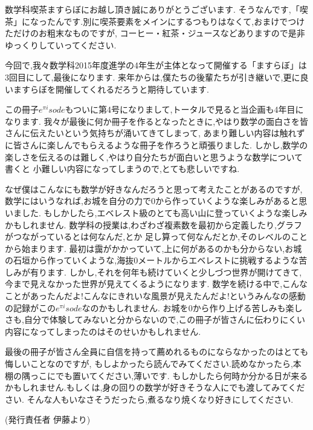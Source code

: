 数学科喫茶ますらぼにお越し頂き誠にありがとうございます.
そうなんです,「喫茶」になったんです.別に喫茶要素をメインにするつもりはなくて,おまけでつけただけのお粗末なものですが,
コーヒー・紅茶・ジュースなどありますので是非ゆっくりしていってください.\par

今回で,我々数学科2015年度進学の4年生が主体となって開催する「ますらぼ」は3回目にして,最後になります.
来年からは,僕たちの後輩たちが引き継いで,更に良いますらぼを開催してくれるだろうと期待しています.\par

この冊子$e^{\pi i}sode$もついに第4号になりまして,トータルで見ると当企画も4年目になります.
我々が最後に何か冊子を作るとなったときに,やはり数学の面白さを皆さんに伝えたいという気持ちが涌いてきてしまって,
あまり難しい内容は触れずに皆さんに楽しんでもらえるような冊子を作ろうと頑張りました.
しかし,数学の楽しさを伝えるのは難しく,やはり自分たちが面白いと思うような数学について書くと
小難しい内容になってしまうので,とても悲しいですね.\par

なぜ僕はこんなにも数学が好きなんだろうと思って考えたことがあるのですが,
数学にはいうなれば,お城を自分の力で$0$から作っていくような楽しみがあると思いました.
もしかしたら,エベレスト級のとても高い山に登っていくような楽しみかもしれません.
数学科の授業は,わざわざ複素数を最初から定義したり,グラフがつながっているとは何なんだ,とか
足し算って何なんだとか,そのレベルのことから始まります.
最初は靄がかかっていて,上に何があるのかも分からない,お城の石垣から作っていくような,海抜$0$メートルからエベレストに挑戦するような苦しみが有ります.
しかし,それを何年も続けていくと少しづつ世界が開けてきて,今まで見えなかった世界が見えてくるようになります.
数学を続ける中で,こんなことがあったんだよ!こんなにきれいな風景が見えたんだよ!というみんなの感動の記録がこの$e^{\pi i}sode$なのかもしれません.
お城を$0$から作り上げる苦しみも楽しさも,自分で体験してみないと分からないので,この冊子が皆さんに伝わりにくい内容になってしまったのはそのせいかもしれません.
\par
最後の冊子が皆さん全員に自信を持って薦めれるものにならなかったのはとても悔しいことなのですが,
もしよかったら読んでみてください.読めなかったら,本棚の隅っこにでも置いてください,薄いです.
もしかしたら何時か分かる日が来るかもしれません.もしくは,身の回りの数学が好きそうな人にでも渡してみてください.
そんな人もいなさそうだったら,煮るなり焼くなり好きにしてください.
\par
(発行責任者 伊藤より)